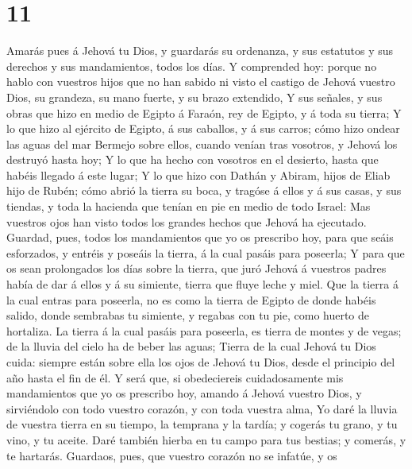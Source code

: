 \hypertarget{section-10}{%
\section{11}\label{section-10}}

 Amarás pues á Jehová tu Dios, y guardarás su ordenanza, y
sus estatutos y sus derechos y sus mandamientos, todos los días.
 Y comprended hoy: porque no hablo con vuestros hijos que
no han sabido ni visto el castigo de Jehová vuestro Dios, su grandeza,
su mano fuerte, y su brazo extendido,  Y sus señales, y
sus obras que hizo en medio de Egipto á Faraón, rey de Egipto, y á toda
su tierra;  Y lo que hizo al ejército de Egipto, á sus
caballos, y á sus carros; cómo hizo ondear las aguas del mar Bermejo
sobre ellos, cuando venían tras vosotros, y Jehová los destruyó hasta
hoy;  Y lo que ha hecho con vosotros en el desierto, hasta
que habéis llegado á este lugar;  Y lo que hizo con Dathán
y Abiram, hijos de Eliab hijo de Rubén; cómo abrió la tierra su boca, y
tragóse á ellos y á sus casas, y sus tiendas, y toda la hacienda que
tenían en pie en medio de todo Israel:  Mas vuestros ojos
han visto todos los grandes hechos que Jehová ha ejecutado.
 Guardad, pues, todos los mandamientos que yo os prescribo
hoy, para que seáis esforzados, y entréis y poseáis la tierra, á la cual
pasáis para poseerla;  Y para que os sean prolongados los
días sobre la tierra, que juró Jehová á vuestros padres había de dar á
ellos y á su simiente, tierra que fluye leche y miel. 
Que la tierra á la cual entras para poseerla, no es como la tierra de
Egipto de donde habéis salido, donde sembrabas tu simiente, y regabas
con tu pie, como huerto de hortaliza.  La tierra á la
cual pasáis para poseerla, es tierra de montes y de vegas; de la lluvia
del cielo ha de beber las aguas;  Tierra de la cual
Jehová tu Dios cuida: siempre están sobre ella los ojos de Jehová tu
Dios, desde el principio del año hasta el fin de él.  Y
será que, si obedeciereis cuidadosamente mis mandamientos que yo os
prescribo hoy, amando á Jehová vuestro Dios, y sirviéndolo con todo
vuestro corazón, y con toda vuestra alma,  Yo daré la
lluvia de vuestra tierra en su tiempo, la temprana y la tardía; y
cogerás tu grano, y tu vino, y tu aceite.  Daré también
hierba en tu campo para tus bestias; y comerás, y te hartarás.
 Guardaos, pues, que vuestro corazón no se infatúe, y os
